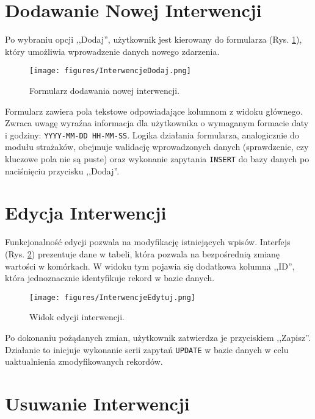 \section{Dodawanie Nowej Interwencji}
\label{sec:interwencje_dodaj}

Po wybraniu opcji ,,Dodaj'', użytkownik jest kierowany do formularza (Rys. \ref{fig:interwencje_dodaj_form}), który umożliwia wprowadzenie danych nowego zdarzenia.

\begin{figure}[H]
	\centering
	\texttt{[image: figures/InterwencjeDodaj.png]}
	\caption{Formularz dodawania nowej interwencji.}
	\label{fig:interwencje_dodaj_form}
\end{figure}

Formularz zawiera pola tekstowe odpowiadające kolumnom z widoku głównego. Zwraca uwagę wyraźna informacja dla użytkownika o wymaganym formacie daty i godziny: \texttt{YYYY-MM-DD HH-MM-SS}. Logika działania formularza, analogicznie do modułu strażaków, obejmuje walidację wprowadzonych danych (sprawdzenie, czy kluczowe pola nie są puste) oraz wykonanie zapytania \texttt{INSERT} do bazy danych po naciśnięciu przycisku ,,Dodaj''.

\section{Edycja Interwencji}
\label{sec:interwencje_edycja}

Funkcjonalność edycji pozwala na modyfikację istniejących wpisów. Interfejs (Rys. \ref{fig:interwencje_edycja_widok}) prezentuje dane w tabeli, która pozwala na bezpośrednią zmianę wartości w komórkach. W widoku tym pojawia się dodatkowa kolumna ,,ID'', która jednoznacznie identyfikuje rekord w bazie danych.

\begin{figure}[H]
    \centering
    \texttt{[image: figures/InterwencjeEdytuj.png]}
    \caption{Widok edycji interwencji.}
    \label{fig:interwencje_edycja_widok}
\end{figure}

Po dokonaniu pożądanych zmian, użytkownik zatwierdza je przyciskiem ,,Zapisz''. Działanie to inicjuje wykonanie serii zapytań \texttt{UPDATE} w bazie danych w celu uaktualnienia zmodyfikowanych rekordów.

\section{Usuwanie Interwencji}
\label{sec:interwencje_usuniecie}

